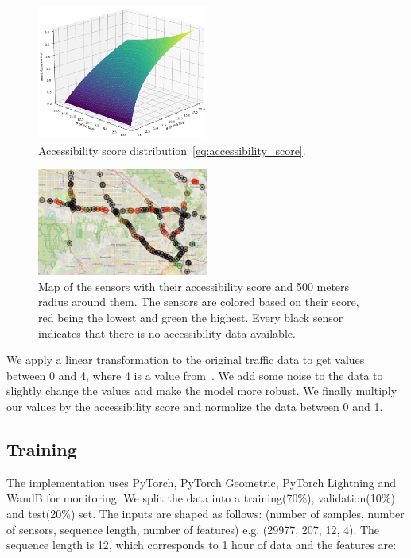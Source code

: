 \begin{figure}[htbp]
    \centering
    \includegraphics[width=0.5\textwidth]{resources/accessibility_score_function}
    \caption{Accessibility score distribution~\eqref{eq:accessibility_score}.}
    \label{fig:accessibility_score_function}
\end{figure}

\begin{figure}[htbp]
    \centering
    \includegraphics[width=0.5\textwidth]{resources/map}
    \caption{
        Map of the sensors with their accessibility score and 500 meters radius around them.
        The sensors are colored based on their score, red being the lowest and green the highest.
        Every black sensor indicates that there is no accessibility data available.
    }
    \label{fig:map}
\end{figure}

We apply a linear transformation to the original traffic data to get values between 0 and 4, where 4 is a value from~\cite{FreedomMobility}.
We add some noise to the data to slightly change the values and make the model more robust.
We finally multiply our values by the accessibility score and normalize the data between 0 and 1.

\subsection{Training}\label{subsec:training}
The implementation uses PyTorch, PyTorch Geometric, PyTorch Lightning and WandB for monitoring.
We split the data into a training(70\%), validation(10\%) and test(20\%) set.
The inputs are shaped as follows: (number of samples, number of sensors, sequence length, number of features) e.g. (29977, 207, 12, 4).
The sequence length is 12, which corresponds to 1 hour of data and the features are:

